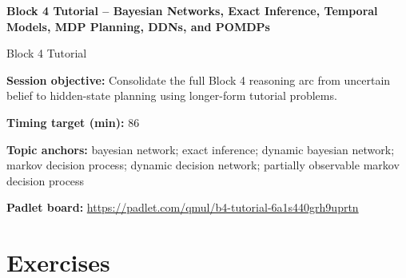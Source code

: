 \documentclass[11pt]{article}
\begin{document}
\begin{center}\LARGE\bfseries Block 4 Tutorial -- Bayesian Networks, Exact Inference, Temporal Models, MDP Planning, DDNs, and POMDPs\end{center}

\begin{center}\large Block 4 Tutorial\end{center}

\begin{tcolorbox}[colback=MidnightBlue!4,colframe=MidnightBlue,title={Session Overview},fonttitle=\bfseries,breakable]
\textbf{Session objective:} Consolidate the full Block 4 reasoning arc from uncertain belief to hidden-state planning using longer-form tutorial problems.

\textbf{Timing target (min):} 86

\textbf{Topic anchors:} bayesian network; exact inference; dynamic bayesian network; markov decision process; dynamic decision network; partially observable markov decision process

\textbf{Padlet board:} \url{https://padlet.com/qmul/b4-tutorial-6a1s440grh9uprtn}
\end{tcolorbox}

\section*{Exercises}
\end{document}
